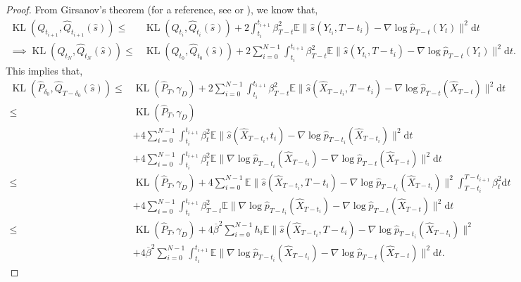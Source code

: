 \documentclass[12pts]{article}
\newcommand{\diff}{\mathrm{d}}
\newcommand{\hP}{ \hat{P}}
\newcommand{\hQ}{ \hat{Q}}
\newcommand{\hX}{ \widehat{X}}
\newcommand{\E}{\mathbb{E}}
\newcommand{\hp}{\hat{p}}
\newcommand{\kl}{\operatorname{KL}}
\begin{document}
\begin{proof}
From Girsanov's theorem (for a reference, see \citep[Lemma 20]{dou2024optimalscorematchingoptimal} or \citep[Theorem 8.6.5]{oksendal2003stochastic}), we know that,
\begin{align*}
    \kl(Q_{t_{i+1}}, \hQ_{t_{i+1}} (\hat{s})) \le & \kl(Q_{t_i}, \hQ_{t_i}(\hat{s})) + 2 \int_{t_i}^{t_{i+1}} \beta^2_{T-t} \E \|\hat{s}(Y_{t_i}, T-t_i) - \nabla \log \hp_{T-t}(Y_t)\|^2 \diff  t\\
  \implies  \kl(Q_{t_N}, \hQ_{t_N}(\hat{s})) \le & \kl(Q_{t_0}, \hQ_{t_0}(\hat{s})) + 2 \sum_{i=0}^{N-1}\int_{t_i}^{t_{i+1}} \beta^2_{T-t} \E\|\hat{s}(Y_{t_i}, T-t_i) - \nabla \log \hp_{T-t}(Y_t)\|^2 \diff  t.
\end{align*}
This implies that,
\begingroup
\allowdisplaybreaks
\begin{align}
      \kl(\hP_{\delta_0}, \hQ_{T-\delta_0}(\hat{s}))
  \le & \kl(\hP_T, \gamma_D) + 2 \sum_{i=0}^{N-1}\int_{t_i}^{t_{i+1}} \beta^2_{T-t} \E \|\hat{s}(\hX_{T-t_i}, T-t_i) - \nabla \log \hp_{T-t}(\hX_{T-t})\|^2 \diff  t \nonumber\\
  \le & \kl(\hP_T, \gamma_D) \nonumber\\
  & + 4 \sum_{i=0}^{N-1}\int_{t_i}^{t_{i+1}} \beta^2_{t}\E \|\hat{s}(\hX_{T-t_i}, t_i) - \nabla \log \hp_{T-t_i}(\hX_{T-t_i})\|^2  \diff t \nonumber\\
  & + 4 \sum_{i=0}^{N-1}\int_{t_i}^{t_{i+1}} \beta^2_{t} \E \|\nabla \log \hp_{T-t_i}(\hX_{T-t_i}) - \nabla \log \hp_{T-t}(\hX_{T-t})\|^2 \diff  t \nonumber\\
  \le & \kl(\hP_T, \gamma_D) + 4 \sum_{i=0}^{N-1} \E \|\hat{s}(\hX_{T-t_i}, T-t_i) - \nabla \log \hp_{T-t_i}(\hX_{T-t_i})\|^2  \int_{T-t_i}^{T-t_{i+1}}  \beta^2_{t} \diff  t \nonumber\\
  & +  4 \sum_{i=0}^{N-1}\int_{t_i}^{t_{i+1}} \beta^2_{T-t} \E \|\nabla \log \hp_{T-t_i}(\hX_{T-t_i}) - \nabla \log \hp_{T-t}(\hX_{T-t})\|^2 \diff  t \nonumber\\
  \le &  \kl(\hP_T, \gamma_D) + 4 \overline{\beta}^2 \sum_{i=0}^{N-1} h_i \E \|\hat{s}(\hX_{T-t_i}, T-t_i) - \nabla \log \hp_{T-t_i}(\hX_{T-t_i})\|^2   \nonumber\\
  & +  4 \overline{\beta}^2 \sum_{i=0}^{N-1}\int_{t_i}^{t_{i+1}} \E \|\nabla \log \hp_{T-t_i}(\hX_{T-t_i}) - \nabla \log \hp_{T-t}(\hX_{T-t})\|^2 \diff  t . \label{e7}
\end{align}
\endgroup
\end{proof}
\end{document}
